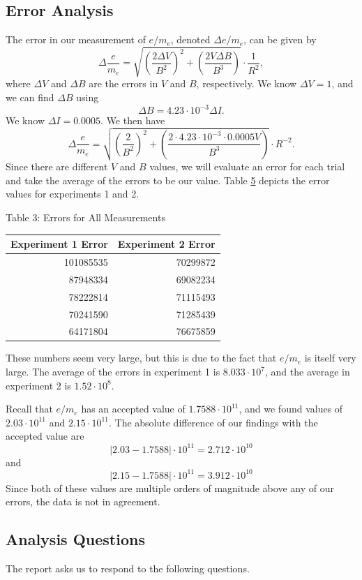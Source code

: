 \documentclass[11pt, letterpaper]{report}
\begin{document}
\subsection{Error Analysis}\label{sec:3.3}
The error in our measurement of $e /m_e$, denoted $\Delta e/m_e$, can be given by
\[
	\Delta \frac{e}{m_e}=\sqrt{\left( \frac{2\Delta V}{B^2} \right) ^2+\left( \frac{2V\Delta B}{B^3} \right) } \cdot \frac{1}{R^2}
,\]
where $\Delta V$ and $\Delta B$ are the errors in $V$ and $B$, respectively. We know $\Delta V=1$, and we can find $\Delta B$ using
\[
	\Delta B=4.23\cdot 10^{-3}\Delta I
.\]
We know $\Delta I=0.0005$. We then have
\[
	\Delta \frac{e}{m_e}=\sqrt{\left( \frac{2}{B^2} \right) ^2+\left( \frac{2\cdot 4.23\cdot 10^{-3}\cdot 0.0005V}{B^3} \right) } \cdot R^{-2}
.\]
Since there are different $V$ and $B$ values, we will evaluate an error for each trial and take the average of the errors to be our value. Table \hyperref[tab:5]{5} depicts the error values for experiments 1 and 2.
\begin{center}
	Table 3: Errors for All Measurements\label{tab:5}\vspace{5pt}\\
	\begin{tabular}{rr}
		\toprule
		Experiment 1 Error&Experiment 2 Error\\
		\midrule
		101085535&70299872\\
		87948334&69082234\\
		78222814&71115493\\
		70241590&71285439\\
		64171804&76675859\\
		\bottomrule
	\end{tabular}
\end{center}
These numbers seem very large, but this is due to the fact that $e /m_e$ is itself very large. The average of the errors in experiment 1 is $8.033\cdot 10^{7}$, and the average in experiment 2 is $1.52\cdot 10^{8}$.

Recall that $e / m_e$ has an accepted value of $1.7588\cdot 10^{11}$, and we found values of $2.03\cdot 10^{11}$ and $2.15\cdot 10^{11}$. The absolute difference of our findings with the accepted value are
\[
	\left| 2.03-1.7588 \right| \cdot 10^{11}=2.712\cdot 10^{10}
\]
and
\[
	\left| 2.15-1.7588 \right| \cdot 10^{11}=3.912\cdot 10^{10}
\]
Since both of these values are multiple orders of magnitude above any of our errors, the data is not in agreement.
\subsection{Analysis Questions}
The report asks us to respond to the following questions.
\end{document}
